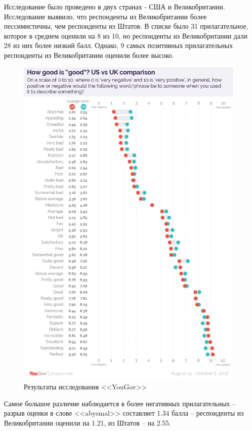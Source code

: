 Исследование было проведено в двух странах - США и Великобритании. Исследование выявило, что респонденты из Великобритании более пессимистичны, чем респонденты из Штатов. В списке было 31 прилагательное, которое в среднем оценили на 8 из 10, но респонденты из Великобритании дали 28 из них более низкий балл. Однако, 9 самых позитивных прилагательных респонденты из Великобритании оценили более высоко. 
\begin{center}
	\begin{figure}[H]
		\centering
		\includegraphics[width=\linewidth]{assets/goodisgood-all.png}
		\caption{Результаты исследования <<YouGov>>\cite{goodisgood}}
		\label{fig:gig-all}
	\end{figure}
\end{center}
Самое большое различие наблюдается в более негативных прилагательных -- разрыв оценки в слове <<abysmal>> составляет 1.34 балла -- респонденты из Великобритании оценили на  1.21, из Штатов -- на 2.55. 
 
